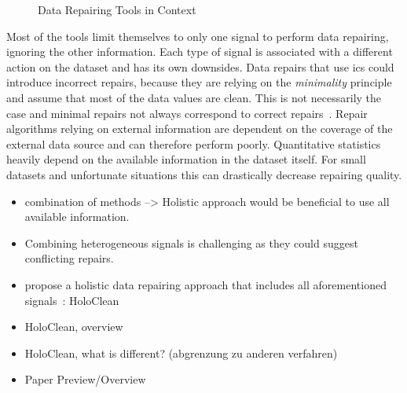 \begin{figure}[hbt]

    \caption{Data Repairing Tools in Context}
    \label{fig:tools}
  \end{figure}

  \bigskip
  Most of the tools limit themselves to only one signal to perform data repairing, ignoring the other information.
  Each type of signal is associated with a different action on the dataset and has its own downsides.
  Data repairs that use \glspl{ic} could introduce incorrect repairs, because they are relying on the \textit{minimality} principle and assume that most of the data values are clean.
  This is not necessarily the case and minimal repairs not always correspond to correct repairs~\cite{holoclean}.
  Repair algorithms relying on external information are dependent on the coverage of the external data source and can therefore perform poorly.
  Quantitative statistics heavily depend on the available information in the dataset itself.
  For small datasets and unfortunate situations this can drastically decrease repairing quality.
  
  \begin{itemize}
    \item combination of methods --> Holistic approach would be beneficial to use all available information.
    \item Combining heterogeneous signals is challenging as they could suggest conflicting repairs.
    \item \citeauthor{holoclean} propose a holistic data repairing approach that includes all aforementioned signals~\cite{holoclean}: HoloClean
    \item HoloClean, overview
    \item HoloClean, what is different? (abgrenzung zu anderen verfahren)
    \item Paper Preview/Overview
  \end{itemize}


